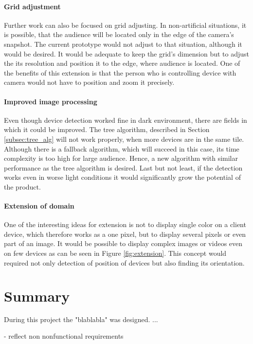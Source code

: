 \paragraph{Grid adjustment}
Further work can also be focused on grid adjusting.
In non-artificial situations, it is possible, that the audience will be located only in the edge of the camera's snapshot.
The current prototype would not adjust to that situation, although it would be desired.
It would be adequate to keep the grid's dimension but to adjust the its resolution and position it to the edge, where audience is located.
One of the benefits of this extension is that the person who is controlling device with camera would not have to position and zoom it precisely.

\paragraph{Improved image processing}
Even though device detection worked fine in dark environment, there are fields in which it could be improved.
The tree algorithm, described in Section \ref{subsec:tree_alg} will not work properly, when more devices are in the same tile.
Although there is a fallback algorithm, which will succeed in this case, its time complexity is too high for large audience.
Hence, a new algorithm with similar performance as the tree algorithm is desired.
Last but not least, if the detection works even in worse light conditions it would significantly grow the potential of the product.

\paragraph{Extension of domain}
One of the interesting ideas for extension is not to display single color on a client device, which therefore works as a one pixel, but to display several pixels or even part of an image.
It would be possible to display complex images or videos even on few devices as can be seen in Figure \ref{fig:extension}.
This concept would required not only detection of position of devices but also finding its orientation.

\section{Summary}

During this project the "blablabla" was designed. ...


- reflect non nonfunctional requirements